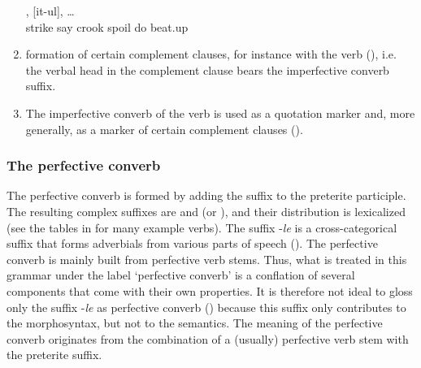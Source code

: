 \begin{enumerate}
\begin{exe}
		\ex	\label{ex:‎‎hitting with the crook, disturbing, beating up}
		,	[it-ul], \ldots\\
			strike	say	crook	spoil	do		beat.up\\
		\glt	{}
	\end{exe}

	\item	formation of certain complement clauses, for instance with the verb  (), i.e. the verbal head in the complement clause bears the imperfective converb suffix.

	\item	The imperfective converb of the verb   is used as a quotation marker and, more generally, as a marker of certain complement clauses ().

\end{enumerate}


\subsubsection{The perfective converb}
\label{sssec:The perfective converb}

The perfective converb is formed by adding the suffix  to the preterite participle. The resulting complex suffixes are  and  (or ), and their distribution is lexicalized (see the tables in  for many example verbs). The suffix -\textit{le} is a cross-categorical suffix that forms adverbials from various parts of speech (). The perfective converb is mainly built from perfective verb stems. Thus, what is treated in this grammar under the label `perfective converb' is a conflation of several components that come with their own properties. It is therefore not ideal to gloss only the suffix -\textit{le} as perfective converb () because this suffix only contributes to the morphosyntax, but not to the semantics. The meaning of the perfective converb originates from the combination of a (usually) perfective verb stem with the preterite suffix.


